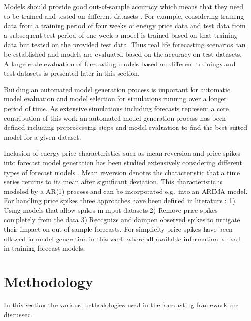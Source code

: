 Models should provide good out-of-sample accuracy which means that they need to be trained and tested on different datasets \cite{hyndman2012forecasting}. For example, considering training data from a training period of four weeks of energy price data and test data from a subsequent test period of one week a model is trained based on that training data but tested on the provided test data. Thus real life forecasting scenarios can be established and models are evaluated based on the accuracy on test datasets. A large scale evaluation of forecasting models based on different trainings and test datasets is presented later in this section. 

Building an automated model generation process is important for automatic model evaluation and model selection for simulations running over a longer period of time. As extensive simulations including forecasts represent a core contribution of this work an automated model generation process has been defined including preprocessing steps and model evaluation to find the best suited model for a given dataset. 

Inclusion of energy price characteristics such as mean reversion and price spikes into forecast model generation has been studied extensively considering different types of forecast models \cite{weron2008forecasting,bunn2003forecasting,aggarwal2009electricity}. Mean reversion denotes the characteristic that a time series returns to its mean after significant deviation. This characteristic is modeled by a AR(1) process and can be incorporated e.g.~into an ARIMA model. For handling price spikes three approaches have been defined in literature \cite{weron2008forecasting}: 1) Using models that allow spikes in input datasets 2) Remove price spikes completely from the data 3) Recognize and dampen observed spikes to mitigate their impact on out-of-sample forecasts. For simplicity price spikes have been allowed in model generation in this work where all available information is used in training forecast models. 



\section{Methodology}

In this section the various methodologies used in the forecasting framework are discussed. 


